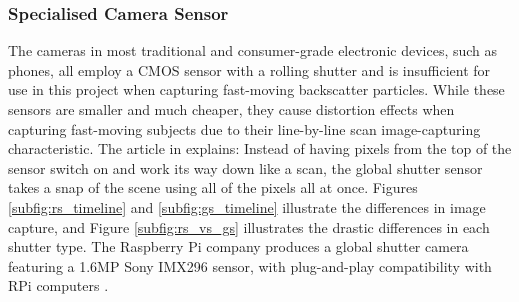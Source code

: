 \subsubsection{Specialised Camera Sensor}
The cameras in most traditional and consumer-grade electronic devices, such as phones, all employ a CMOS sensor with a rolling shutter and is insufficient for use in this project when capturing fast-moving backscatter particles. While these sensors are smaller and much cheaper, they cause distortion effects when capturing fast-moving subjects due to their line-by-line scan image-capturing characteristic. The article in \cite{updatedWhatGlobalShutter2021} explains: Instead of having pixels from the top of the sensor switch on and work its way down like a scan, the global shutter sensor takes a snap of the scene using all of the pixels all at once. Figures \ref{subfig:rs_timeline} and \ref{subfig:gs_timeline} illustrate the differences in image capture, and Figure \ref{subfig:rs_vs_gs} illustrates the drastic differences in each shutter type. The Raspberry Pi company produces a global shutter camera featuring a 1.6MP Sony IMX296 sensor, with plug-and-play compatibility with RPi computers \cite{raspberrypiltdBuyRaspberryPib}.

